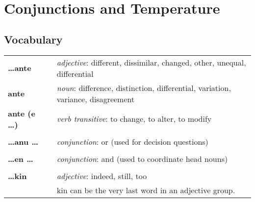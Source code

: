 \section{Conjunctions and Temperature}
%
\subsection*{Vocabulary}
%
\begin{supertabular}{p{2,5cm}|ll}
    \textbf{\dots ante}       &  & \textit{adjective}: different, dissimilar, changed, other, unequal, differential            \\ %
    \textbf{ante}             &  & \textit{noun}: difference, distinction, differential, variation, variance, disagreement     \\ %
    \textbf{ante (e \dots)}   &  & \textit{verb transitive}: to change, to alter, to modify                                    \\ %
                              &  &                                                                                             \\ %
    \textbf{\dots anu \dots}  &  & \textit{conjunction}: or (used for decision questions)                                      \\ %
                              &  &                                                                                             \\ %
    \textbf{\dots en \dots}   &  & \textit{conjunction}: and (used to coordinate head nouns)                                   \\ %
                              &  &                                                                                             \\ %
    \textbf{\dots kin}        &  & \textit{adjective}: indeed, still, too                                                      \\ && kin can be the very last word in an adjective group. \\ %

\end{supertabular}
